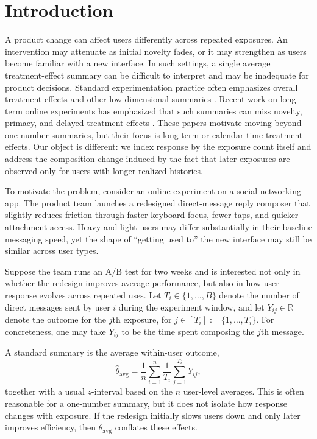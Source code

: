 \documentclass[sigconf,anonymous,review]{acmart}
\begin{document}
\maketitle

\section{Introduction}

A product change can affect users differently across repeated exposures. An intervention may attenuate as initial novelty fades, or it may strengthen as users become familiar with a new interface. In such settings, a single average treatment-effect summary can be difficult to interpret and may be inadequate for product decisions. Standard experimentation practice often emphasizes overall treatment effects and other low-dimensional summaries \cite{Kohavi2008}. Recent work on long-term online experiments has emphasized that such summaries can miss novelty, primacy, and delayed treatment effects \cite{Hohnhold2015,Dmitriev2016,Sadeghi2022}. These papers motivate moving beyond one-number summaries, but their focus is long-term or calendar-time treatment effects. Our object is different: we index response by the exposure count itself and address the composition change induced by the fact that later exposures are observed only for users with longer realized histories.

To motivate the problem, consider an online experiment on a social-networking app. The product team launches a redesigned direct-message reply composer that slightly reduces friction through faster keyboard focus, fewer taps, and quicker attachment access. Heavy and light users may differ substantially in their baseline messaging speed, yet the shape of ``getting used to'' the new interface may still be similar across user types.

Suppose the team runs an A/B test for two weeks and is interested not only in whether the redesign improves average performance, but also in how user response evolves across repeated uses. Let $T_i\in\{1,\dots,B\}$ denote the number of direct messages sent by user $i$ during the experiment window, and let $Y_{ij}\in\mathbb{R}$ denote the outcome for the $j$th exposure, for $j\in[T_i]:=\{1,\dots,T_i\}$. For concreteness, one may take $Y_{ij}$ to be the time spent composing the $j$th message.

A standard summary is the average within-user outcome,
\[
\hat\theta_{\mathrm{avg}}
=
\frac{1}{n}\sum_{i=1}^n \frac{1}{T_i}\sum_{j=1}^{T_i} Y_{ij},
\]
together with a usual $z$-interval based on the $n$ user-level averages. This is often reasonable for a one-number summary, but it does not isolate how response changes with exposure. If the redesign initially slows users down and only later improves efficiency, then $\hat\theta_{\mathrm{avg}}$ conflates these effects.
\end{document}
